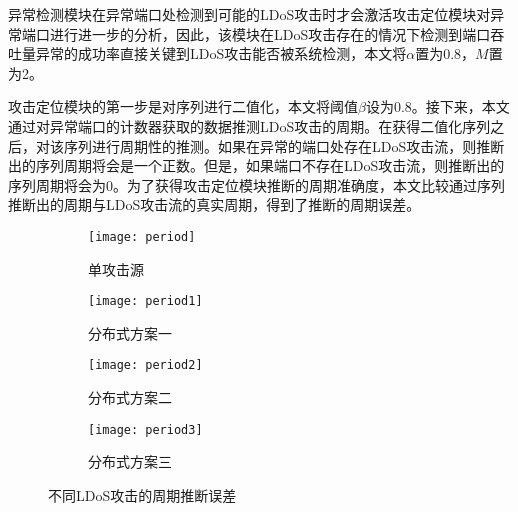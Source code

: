 异常检测模块在异常端口处检测到可能的LDoS攻击时才会激活攻击定位模块对异常端口进行进一步的分析，因此，该模块在LDoS攻击存在的情况下检测到端口吞吐量异常的成功率直接关键到LDoS攻击能否被系统检测，本文将$\alpha$置为0.8，$M$置为2。








攻击定位模块的第一步是对序列进行二值化，本文将阈值$\beta$设为0.8。接下来，本文通过对异常端口的计数器获取的数据推测LDoS攻击的周期。在获得二值化序列之后，对该序列进行周期性的推测。如果在异常的端口处存在LDoS攻击流，则推断出的序列周期将会是一个正数。但是，如果端口不存在LDoS攻击流，则推断出的序列周期将会为0。为了获得攻击定位模块推断的周期准确度，本文比较通过序列推断出的周期与LDoS攻击流的真实周期，得到了推断的周期误差。

\begin{figure}
    \begin{subfigure}{.49\textwidth}
        \centering
        \texttt{[image: period]}
        \caption{单攻击源}
        \label{fig:period-single}
    \end{subfigure}
    \begin{subfigure}{.49\textwidth}
        \centering
        \texttt{[image: period1]}
        \caption{分布式方案一}
        \label{fig:period-2h-mod1}
    \end{subfigure}

    \begin{subfigure}{.49\textwidth}
        \centering
        \texttt{[image: period2]}
        \caption{分布式方案二}
        \label{fig:period-2h-mod2}
    \end{subfigure}
    \begin{subfigure}{.49\textwidth}
        \centering
        \texttt{[image: period3]}
        \caption{分布式方案三}
        \label{fig:period-2h-mod3}
    \end{subfigure}


    \caption{不同LDoS攻击的周期推断误差}
    \label{fig:period-all}
\end{figure}


